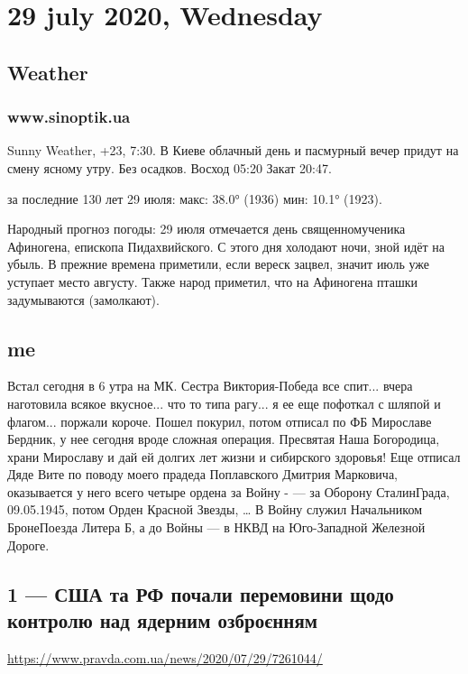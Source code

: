 

\section{29 july 2020, Wednesday}
\subsection{Weather}

\subsubsection{www.sinoptik.ua}

Sunny Weather, +23, 7:30. В Киеве облачный день и пасмурный вечер придут на
смену ясному утру. Без осадков. Восход 05:20 Закат 20:47.

за последние 130 лет 29 июля: макс: 38.0° (1936) мин: 10.1° (1923).

Народный прогноз погоды: 29 июля отмечается день священномученика Афиногена,
епископа Пидахвийского. С этого дня холодают ночи, зной идёт на убыль. В
прежние времена приметили, если вереск зацвел, значит июль уже уступает место
августу. Также народ приметил, что на Афиногена пташки задумываются
(замолкают).

\subsection{me}

Встал сегодня в 6 утра на МК. Сестра Виктория-Победа все спит... вчера наготовила всякое
вкусное...  что то типа рагу... я ее еще пофоткал с шляпой и флагом... поржали
короче.  Пошел покурил, потом отписал по ФБ Мирославе Бердник, у нее сегодня
вроде сложная операция. Пресвятая Наша Богородица, храни Мирославу и дай ей
долгих лет жизни и сибирского здоровья! Еще отписал Дяде Вите по поводу моего
прадеда Поплавского Дмитрия Марковича, оказывается у него всего четыре ордена за Войну - 
--- за Оборону СталинГрада, 09.05.1945, потом Орден Красной Звезды, \ldots
В Войну служил Начальником БронеПоезда Литера Б, а до Войны --- в НКВД на Юго-Западной Железной Дороге.

\subsection{1 --- США та РФ почали перемовини щодо контролю над ядерним озброєнням}
\url{https://www.pravda.com.ua/news/2020/07/29/7261044/}

